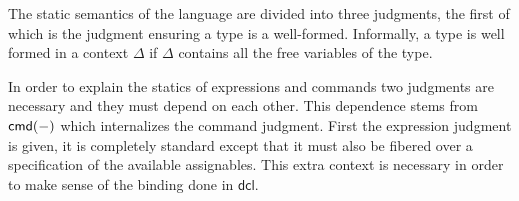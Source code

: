 The static semantics of the language are divided into three judgments,
the first of which is the judgment ensuring a type is a
well-formed. Informally, a type is well formed in a context $\Delta$
if $\Delta$ contains all the free variables of the type.
In order to explain the statics of expressions and commands two
judgments are necessary and they must depend on each other. This
dependence stems from $\mathsf{cmd}(-)$ which internalizes the command
judgment. First the expression judgment is given, it is completely
standard except that it must also be fibered over a specification of
the available assignables. This extra context is necessary in order to
make sense of the binding done in $\mathsf{dcl}$.
